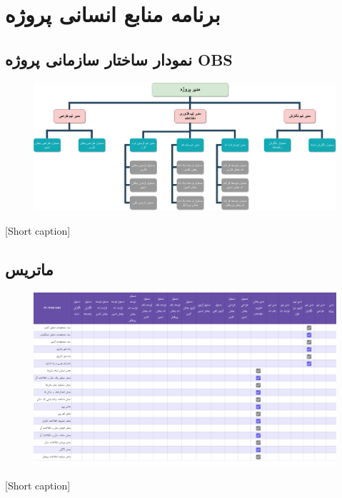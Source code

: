 \section{
برنامه منابع انسانی پروژه
}

\subsection{
نمودار ساختار سازمانی پروژه OBS
}

\begin{center}
  \begin{figure} [h!]
    { \includegraphics[width=\textwidth]{appandecies/OBS.png}}
  \end{figure}
  [Short caption]{}
\end{center}


\subsection{
ماتریس
}

\begin{center}
  \begin{figure} [h!]
    { \includegraphics[width=\textwidth]{appandecies/PCWBS-OBS.pdf}}
  \end{figure}
  [Short caption]{}
\end{center}
\pagebreak

